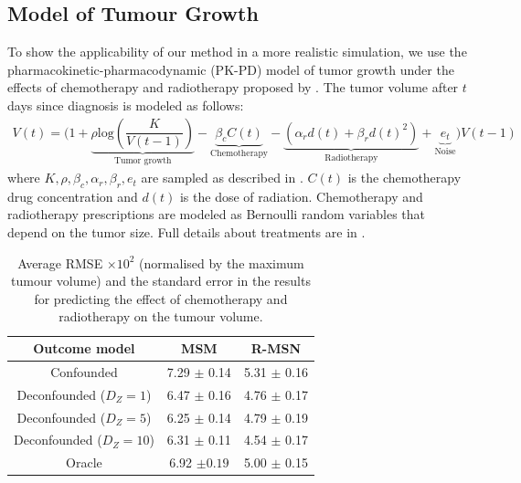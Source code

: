 \documentclass{article}
\begin{document}
	
	
	
	
	
	\subsection{Model of Tumour Growth}
	
	To show the applicability of our method in a more realistic simulation, we use the pharmacokinetic-pharmacodynamic (PK-PD) model of tumor growth under the effects of chemotherapy and radiotherapy proposed by \citet{geng2017prediction}. The tumor volume after $t$ days since diagnosis is modeled as follows:
	\begin{equation}
	\begin{aligned}
	V(t) ={}  \Big( 1 +  \underbrace{\rho \text{log}(\dfrac{K}{V(t-1)})}_{\text{Tumor growth}} - \underbrace{\beta_c C(t)}_{\text{Chemotherapy}} - 
	\underbrace{\left(\alpha_r d(t) + \beta_r d(t)^2\right)}_{\text{Radiotherapy}} + \underbrace{e_t}_{\text{Noise}}  \Big)V(t-1) 
	\end{aligned}
	\end{equation}
	where  $K, \rho, \beta_c, \alpha_r, \beta_r, e_t $ are sampled as described in \citet{geng2017prediction}. $C(t)$ is the chemotherapy drug concentration and $d(t)$ is the dose of radiation. Chemotherapy and radiotherapy prescriptions are modeled as Bernoulli random variables that depend on the tumor size. Full details about treatments are in \citet{ lim2018forecasting}. 
	
	\begin{table}[ht]
		\caption{Average  RMSE $\times 10^2$  (normalised by the maximum tumour volume) and the standard error in the results for predicting the effect of chemotherapy and radiotherapy on the tumour volume.}
		\label{tab:pk_pd}
		\begin{center}
			\begin{small}
				\begin{tabular}{c|cc}
					\toprule
					Outcome model & MSM & R-MSN  \\
					\hline
					Confounded  & 7.29 $\pm$ 0.14   &  5.31 $\pm$ 0.16   \\
					Deconfounded ($D_Z = 1$) &6.47 $\pm$ 0.16  & 4.76 $\pm$ 0.17 \\
					Deconfounded ($D_Z = 5$)  & 6.25 $\pm$ 0.14 & 4.79 $\pm$ 0.19   \\
					Deconfounded ($D_Z = 10$)  & 6.31 $\pm$ 0.11  & 4.54 $\pm$ 0.17 \\
					\hline
					Oracle &  6.92 $\pm 0.19$  & 5.00 $\pm$ 0.15 \\
					\bottomrule
				\end{tabular}
			\end{small}
		\end{center}
	\end{table}
	
\end{document}
